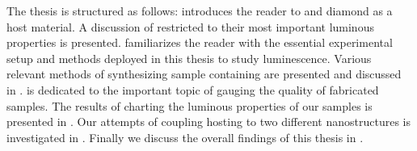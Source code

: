 	The thesis is structured as follows:  introduces the reader to \ccs and diamond as a host material. A discussion of \sivs restricted to their most important luminous properties is presented.  familiarizes the reader with the essential experimental setup and methods deployed in this thesis to study \siv luminescence. Various relevant methods of synthesizing sample \nds containing \sivs are presented and discussed in .  is dedicated to the important topic of gauging the quality of fabricated samples. The results of charting the luminous properties of our \nds samples is presented in . Our attempts of coupling \nds hosting \sivs to two different nanostructures is investigated in . Finally we discuss the overall findings of this thesis in .
